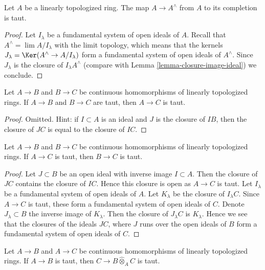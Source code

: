 \begin{lemma}
\label{lemma-completion-taut}
Let $A$ be a linearly topologized ring. The map $A \to A^\wedge$
from $A$ to its completion is taut.
\end{lemma}

\begin{proof}
Let $I_\lambda$ be a fundamental system of open ideals of $A$.
Recall that $A^\wedge = \lim A/I_\lambda$ with the limit topology,
which means that the kernels $J_\lambda = \Ker(A^\wedge \to A/I_\lambda)$
form a fundamental system of open ideals of $A^\wedge$.
Since $J_\lambda$ is the closure of $I_\lambda A^\wedge$
(compare with Lemma \ref{lemma-closure-image-ideal}) we conclude.
\end{proof}

\begin{lemma}
\label{lemma-composition-taut}
Let $A \to B$ and $B \to C$ be continuous homomorphisms of
linearly topologized rings. If $A \to B$ and $B \to C$ are taut, then
$A \to C$ is taut.
\end{lemma}

\begin{proof}
Omitted. Hint: if $I \subset A$ is an ideal and $J$ is the closure
of $IB$, then the closure of $JC$ is equal to the closure of $IC$.
\end{proof}

\begin{lemma}
\label{lemma-permanence-taut}
Let $A \to B$ and $B \to C$ be continuous homomorphisms of
linearly topologized rings. If $A \to C$ is taut, then
$B \to C$ is taut.
\end{lemma}

\begin{proof}
Let $J \subset B$ be an open ideal with inverse image $I \subset A$.
Then the closure of $JC$ contains the closure of $IC$. Hence this
closure is open as $A \to C$ is taut. Let $I_\lambda$ be a fundamental
system of open ideals of $A$. Let $K_\lambda$ be the closure of
$I_\lambda C$. Since $A \to C$ is taut, these form a fundamental
system of open ideals of $C$. Denote $J_\lambda \subset B$ the inverse image
of $K_\lambda$. Then the closure of $J_\lambda C$ is $K_\lambda$.
Hence we see that the closures of the ideals $JC$, where $J$ runs over
the open ideals of $B$ form a fundamental system of open ideals of $C$.
\end{proof}

\begin{lemma}
\label{lemma-base-change-taut}
Let $A \to B$ and $A \to C$ be continuous homomorphisms of
linearly topologized rings. If $A \to B$ is taut, then
$C \to B \widehat{\otimes}_A C$ is taut.
\end{lemma}

